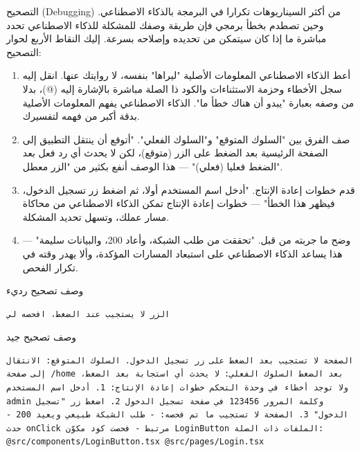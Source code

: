 
التصحيح (Debugging) من أكثر السيناريوهات تكرارا في البرمجة بالذكاء الاصطناعي. وحين تصطدم بخطأ برمجي فإن طريقة وصفك للمشكلة للذكاء الاصطناعي تحدد مباشرة ما إذا كان سيتمكن من تحديده وإصلاحه بسرعة. إليك النقاط الأربع لحوار التصحيح:

\begin{enumerate}
  \item أعط الذكاء الاصطناعي المعلومات الأصلية "ليراها" بنفسه، لا روايتك عنها. انقل إليه سجل الأخطاء وحزمة الاستثناءات والكود ذا الصلة مباشرة بالإشارة إليه (@)، بدلا من وصفه بعبارة "يبدو أن هناك خطأ ما". الذكاء الاصطناعي يفهم المعلومات الأصلية بدقة أكبر من فهمه لتفسيرك.
  \item صف الفرق بين "السلوك المتوقع" و"السلوك الفعلي". "أتوقع أن ينتقل التطبيق إلى الصفحة الرئيسية بعد الضغط على الزر (متوقع)، لكن لا يحدث أي رد فعل بعد الضغط فعليا (فعلي)" — هذا الوصف أنفع بكثير من "الزر معطل".
  \item قدم خطوات إعادة الإنتاج. "أدخل اسم المستخدم أولا، ثم اضغط زر تسجيل الدخول، فيظهر هذا الخطأ" — خطوات إعادة الإنتاج تمكن الذكاء الاصطناعي من محاكاة مسار عملك، وتسهل تحديد المشكلة.
  \item وضح ما جربته من قبل. "تحققت من طلب الشبكة، وأعاد 200، والبيانات سليمة" — هذا يساعد الذكاء الاصطناعي على استبعاد المسارات المؤكدة، وألا يهدر وقته في تكرار الفحص.
\end{enumerate}

وصف تصحيح رديء

\begin{lstlisting}
الزر لا يستجيب عند الضغط، افحصه لي
\end{lstlisting}

وصف تصحيح جيد

\begin{lstlisting}
الصفحة لا تستجيب بعد الضغط على زر تسجيل الدخول. السلوك المتوقع: الانتقال إلى صفحة /home بعد الضغط السلوك الفعلي: لا يحدث أي استجابة بعد الضغط، ولا توجد أخطاء في وحدة التحكم خطوات إعادة الإنتاج: 1. أدخل اسم المستخدم admin وكلمة المرور 123456 في صفحة تسجيل الدخول 2. اضغط زر "تسجيل الدخول" 3. الصفحة لا تستجيب ما تم فحصه: - طلب الشبكة طبيعي ويعيد 200 - حدث onClick مرتبط - فحصت كود مكوّن LoginButton الملفات ذات الصلة: @src/components/LoginButton.tsx @src/pages/Login.tsx
\end{lstlisting}


